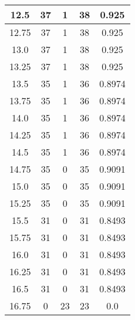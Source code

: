 \documentclass[letterpaper, 12pt]{article}
\begin{document}
\begin{longtable}{|c|c|c|c|c|}
12.5 & 37 & 1 & 38 & 0.925 \\
\hline
12.75 & 37 & 1 & 38 & 0.925 \\
\hline
13.0 & 37 & 1 & 38 & 0.925 \\
\hline
13.25 & 37 & 1 & 38 & 0.925 \\
\hline
13.5 & 35 & 1 & 36 & 0.8974 \\
\hline
13.75 & 35 & 1 & 36 & 0.8974 \\
\hline
14.0 & 35 & 1 & 36 & 0.8974 \\
\hline
14.25 & 35 & 1 & 36 & 0.8974 \\
\hline
14.5 & 35 & 1 & 36 & 0.8974 \\
\hline
14.75 & 35 & 0 & 35 & 0.9091 \\
\hline
15.0 & 35 & 0 & 35 & 0.9091 \\
\hline
15.25 & 35 & 0 & 35 & 0.9091 \\
\hline
15.5 & 31 & 0 & 31 & 0.8493 \\
\hline
15.75 & 31 & 0 & 31 & 0.8493 \\
\hline
16.0 & 31 & 0 & 31 & 0.8493 \\
\hline
16.25 & 31 & 0 & 31 & 0.8493 \\
\hline
16.5 & 31 & 0 & 31 & 0.8493 \\
\hline
16.75 & 0 & 23 & 23 & 0.0 \\
\hline
\end{longtable}
\end{document}
